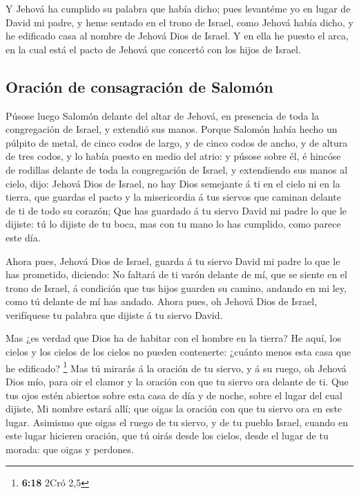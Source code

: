  Y Jehová ha cumplido su palabra que había dicho; pues
levantéme yo en lugar de David mi padre, y heme sentado en el trono de
Israel, como Jehová había dicho, y he edificado casa al nombre de Jehová
Dios de Israel.  Y en ella he puesto el arca, en la cual
está el pacto de Jehová que concertó con los hijos de Israel.

\hypertarget{oraciuxf3n-de-consagraciuxf3n-de-salomuxf3n}{%
\subsection{Oración de consagración de
Salomón}\label{oraciuxf3n-de-consagraciuxf3n-de-salomuxf3n}}

 Púsose luego Salomón delante del altar de Jehová, en
presencia de toda la congregación de Israel, y extendió sus manos.
 Porque Salomón había hecho un púlpito de metal, de cinco
codos de largo, y de cinco codos de ancho, y de altura de tres codos, y
lo había puesto en medio del atrio: y púsose sobre él, é hincóse de
rodillas delante de toda la congregación de Israel, y extendiendo sus
manos al cielo, dijo:  Jehová Dios de Israel, no hay Dios
semejante á ti en el cielo ni en la tierra, que guardas el pacto y la
misericordia á tus siervos que caminan delante de ti de todo su corazón;
 Que has guardado á tu siervo David mi padre lo que le
dijiste: tú lo dijiste de tu boca, mas con tu mano lo has cumplido, como
parece este día.

 Ahora pues, Jehová Dios de Israel, guarda á tu siervo
David mi padre lo que le has prometido, diciendo: No faltará de ti varón
delante de mí, que se siente en el trono de Israel, á condición que tus
hijos guarden su camino, andando en mi ley, como tú delante de mí has
andado.  Ahora pues, oh Jehová Dios de Israel, verifíquese
tu palabra que dijiste á tu siervo David.

 Mas ¿es verdad que Dios ha de habitar con el hombre en la
tierra? He aquí, los cielos y los cielos de los cielos no pueden
contenerte: ¿cuánto menos esta casa que he edificado? \footnote{\textbf{6:18}
  2Cró 2,5}  Mas tú mirarás á la oración de tu siervo, y á
su ruego, oh Jehová Dios mío, para oir el clamor y la oración con que tu
siervo ora delante de ti.  Que tus ojos estén abiertos
sobre esta casa de día y de noche, sobre el lugar del cual dijiste, Mi
nombre estará allí; que oigas la oración con que tu siervo ora en este
lugar.  Asimismo que oigas el ruego de tu siervo, y de tu
pueblo Israel, cuando en este lugar hicieren oración, que tú oirás desde
los cielos, desde el lugar de tu morada: que oigas y perdones.

